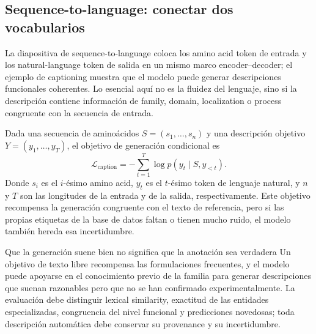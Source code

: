 \subsection{Sequence-to-language: conectar dos vocabularios}

La diapositiva de sequence-to-language coloca los amino acid token de entrada y los natural-language token de salida en un mismo marco encoder--decoder; el ejemplo de captioning muestra que el modelo puede generar descripciones funcionales coherentes. Lo esencial aquí no es la fluidez del lenguaje, sino si la descripción contiene información de family, domain, localization o process congruente con la secuencia de entrada.



Dada una secuencia de aminoácidos $S=(s_1,\ldots,s_n)$ y una descripción objetivo $Y=(y_1,\ldots,y_T)$, el objetivo de generación condicional es
$$
\mathcal{L}_{\text{caption}}=-\sum_{t=1}^{T}\log p(y_t\mid S,y_{<t}).
$$
Donde $s_i$ es el $i$-ésimo amino acid, $y_t$ es el $t$-ésimo token de lenguaje natural, y $n$ y $T$ son las longitudes de la entrada y de la salida, respectivamente. Este objetivo recompensa la generación congruente con el texto de referencia, pero si las propias etiquetas de la base de datos faltan o tienen mucho ruido, el modelo también hereda esa incertidumbre.

\begin{warningbox}{Que la generación suene bien no significa que la anotación sea verdadera}
Un objetivo de texto libre recompensa las formulaciones frecuentes, y el modelo puede apoyarse en el conocimiento previo de la familia para generar descripciones que suenan razonables pero que no se han confirmado experimentalmente. La evaluación debe distinguir lexical similarity, exactitud de las entidades especializadas, congruencia del nivel funcional y predicciones novedosas; toda descripción automática debe conservar su provenance y su incertidumbre.
\end{warningbox}

